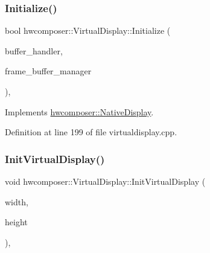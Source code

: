 \subsubsection{\texorpdfstring{Initialize()}{Initialize()}}
{\footnotesize\ttfamily bool hwcomposer\+::\+Virtual\+Display\+::\+Initialize (\begin{DoxyParamCaption}\item[{\mbox{\hyperlink{classhwcomposer_1_1NativeBufferHandler}{Native\+Buffer\+Handler}} $\ast$}]{buffer\+\_\+handler,  }\item[{\mbox{\hyperlink{classhwcomposer_1_1FrameBufferManager}{Frame\+Buffer\+Manager}} $\ast$}]{frame\+\_\+buffer\+\_\+manager }\end{DoxyParamCaption})\hspace{0.3cm}{\ttfamily [override]}, {\ttfamily [virtual]}}



Implements \mbox{\hyperlink{classhwcomposer_1_1NativeDisplay_a008eb015dda9b4ead93186b4897c2e3c}{hwcomposer\+::\+Native\+Display}}.



Definition at line 199 of file virtualdisplay.\+cpp.


\begin{DoxyCode}{0}
\end{DoxyCode}
\mbox{\label{classhwcomposer_1_1VirtualDisplay_ad0bde041f8a66ab112818ded26e650ad}} 
\subsubsection{\texorpdfstring{Init\+Virtual\+Display()}{InitVirtualDisplay()}}
{\footnotesize\ttfamily void hwcomposer\+::\+Virtual\+Display\+::\+Init\+Virtual\+Display (\begin{DoxyParamCaption}\item[{uint32\+\_\+t}]{width,  }\item[{uint32\+\_\+t}]{height }\end{DoxyParamCaption})\hspace{0.3cm}{\ttfamily [override]}, {\ttfamily [virtual]}}



